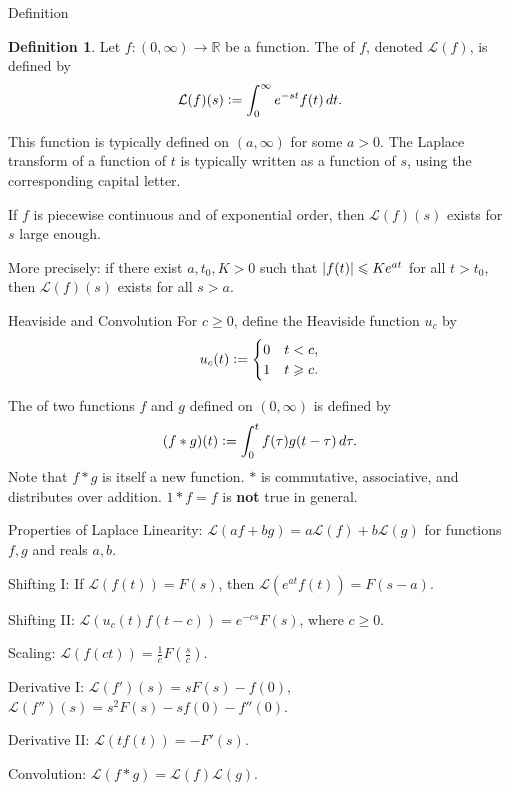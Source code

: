 \documentclass[dvipsnames]{beamer}
\theoremstyle{definition}
\newtheorem{defn}[thm]{Definition}
\let\ge\geqslant
\let\le\leqslant
\begin{document}
\begin{frame}{Definition}
  \begin{defn}
    Let $f : (0, \infty) \to \mathbb{R}$ be a function. \pause The  of $f$, denoted $\mathcal{L}(f)$, is defined by \pause
    \begin{equation*} 
      \mathcal{L}(f)(s) \vcentcolon= \int_{0}^{\infty} e^{-st} f(t) \,dt.
    \end{equation*}
  \end{defn} \pause
  This function is typically defined on $(a, \infty)$ for some $a > 0$. \pause The Laplace transform of a function of $t$ is typically written as a function of $s$, using the corresponding capital letter. \pause

  If $f$ is piecewise continuous and of exponential order, then $\mathcal{L}(f)(s)$ exists for $s$ large enough. \pause 

  More precisely: if there exist $a, t_{0}, K > 0$ \pause such that $\md{f(t)} \le K e^{at}$ for all $t > t_{0}$, \pause then $\mathcal{L}(f)(s)$ exists for all $s > a$.
\end{frame}
\begin{frame}{Heaviside and Convolution}
  For $c \ge 0$, define the Heaviside function $u_{c}$ by
  \begin{equation*} 
    u_{c}(t) \vcentcolon= 
    \begin{cases}
      0 & t < c, \\
      1 & t \ge c.
    \end{cases}
  \end{equation*} \pause

  The  of two functions $f$ and $g$ defined on $(0, \infty)$ is defined by \pause
  \begin{equation*} 
    (f \ast g)(t) \vcentcolon= \int_{0}^{t} f(\tau) g(t - \tau) \,d\tau. 
  \end{equation*} \pause
  Note that $f \ast g$ is itself a new function. \pause $\ast$ is commutative, associative, and distributes over addition. \pause $1 \ast f = f$ is \textbf{not} true in general.
\end{frame}
\begin{frame}{Properties of Laplace}
  Linearity: $\mathcal{L}(af + bg) = a \mathcal{L}(f) + b \mathcal{L}(g)$ for functions $f, g$ and reals $a, b$. \pause 

  Shifting I: If $\mathcal{L}(f(t)) = F(s)$, then $\mathcal{L}(e^{at} f(t)) = F(s - a)$. \pause 

  Shifting II: $\mathcal{L}(u_{c}(t) f(t - c)) = e^{-cs} F(s)$, where $c \ge 0$. \pause 

  Scaling: $\mathcal{L}(f(ct)) = \frac{1}{c} F\left(\frac{s}{c}\right)$. \pause 

  Derivative I: $\mathcal{L}(f')(s) = sF(s) - f(0)$, $\mathcal{L}(f'')(s) = s^{2}F(s) - sf(0) - f''(0)$. \pause 

  Derivative II: $\mathcal{L}(t f(t)) = -F'(s)$. \pause 
 
  Convolution: $\mathcal{L}(f \ast g) = \mathcal{L}(f) \mathcal{L}(g)$. \pause 
\end{frame}
\end{document}
